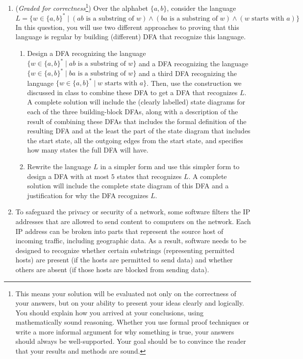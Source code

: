 \documentclass[12pt, oneside]{article}
\begin{document}
\begin{enumerate}
\item ({\it Graded for correctness}\footnote{This means your solution will be
evaluated not only on the correctness of your answers, but on your ability to 
present your ideas clearly and logically. You should explain how you arrived at 
your conclusions, using 
mathematically sound reasoning. Whether you use formal proof techniques or 
write a more informal argument for why 
something is true, your answers should always be well-supported. Your goal 
should be to convince the reader that 
your results and methods are sound.}) Over the alphabet $\{a,b\}$, consider the language
\[
    L = \{ w \in \{a,b\}^* \mid (ab \textrm{ is a substring of $w$}) \land (ba \textrm{ is a substring of $w$})
    \land (w \textrm{ starts with } a)\}
\]
In this question, you will use two different approaches to proving that this language is 
regular by building (different) DFA that recognize this language.
\begin{enumerate}
    \item Design a DFA recognizing the language $\{ w \in \{a,b\}^* \mid ab \textrm{ is a substring of $w$}\}$
    and a DFA recognizing the language $\{ w \in \{a,b\}^* \mid ba \textrm{ is a substring of $w$}\}$
    and a third DFA recognizing the language $\{ w \in \{a,b\}^* \mid w \textrm{ starts with } a\}$. Then, 
    use the construction we discussed in class to combine these DFA to get a DFA that recognizes
    $L$. A complete solution will include the (clearly labelled) state diagrams for each 
    of the three building-block DFAs, along with a description of the result of combining these DFAs that includes
    the formal definition of the resulting DFA and 
    at the least the part of the state diagram that includes the start state, all the outgoing edges
    from the start state, and specifies
    how many states the full DFA will have.
    \item Rewrite the language $L$ in a simpler form and use this simpler form to design a DFA with at most
    $5$ states that recognizes $L$. A complete solution will include the complete state diagram 
    of this DFA and a justification for why the DFA recognizes $L$.
\end{enumerate}

\item  To safeguard the privacy or security of a network, some software filters
the IP addresses that are allowed to send content to computers on the network. Each IP address
can be broken into parts that represent the source host of incoming traffic, including geographic data.
As a result, software needs to be designed to recognize whether certain substrings (representing
permitted hosts) are present (if the hosts are permitted to send data) and whether others
are absent (if those hosts are blocked from sending data).


\end{enumerate}
\end{document}

